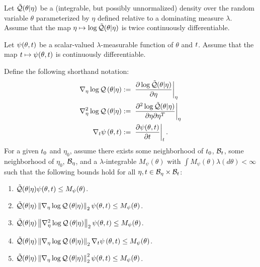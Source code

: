 \begin{assu}
%
Let $\tilde{\mathcal{Q}}(\theta \vert \eta)$ be a (integrable, but possibly unnormalized)
density over the random variable $\theta$ parameterized by $\eta$ defined
relative to a dominating measure $\lambda$.  Assume that the map $\eta \mapsto
\log \tilde{\mathcal{Q}}(\theta \vert \eta)$ is twice continuously differentiable.

Let $\psi(\theta, t)$ be a scalar-valued $\lambda$-measurable function of
$\theta$ and $t$.  Assume that the map $t \mapsto \psi(\theta, t)$ is
continuously differentiable.

Define the following shorthand notation:
%
\begin{align*}
%
\lqgrad{\theta \vert \eta} :={}&
    \fracat{\partial \log \qtil(\theta \vert \eta)}{\partial \eta}{\eta} \\
%
\lqhess{\theta \vert \eta} :={}&
    \fracat{\partial^2 \log \qtil(\theta \vert \eta)}
           {\partial \eta \partial \eta^T}{\eta} \\
%
\psigrad{\theta, \t} :={}& \fracat{\partial \psi(\theta, \t)}{\partial \t}{\t}.
%
\end{align*}
%
For a given $t_0$ and $\eta_0$, assume there exists some neighborhood of
$t_0$, $\mathcal{B}_t$, some neighborhood of $\eta_0$, $\mathcal{B}_\eta$, and a
$\lambda$-integrable $M_\psi(\theta)$ with $\int M_\psi(\theta) \lambda(d\theta) <
\infty$ such that the following bounds hold for all $\eta, t \in \mathcal{B}_\eta
\times \mathcal{B}_t$:
%
\begin{enumerate}
%
\item {}
$\tilde{\mathcal{Q}}(\theta \vert \eta) \psi(\theta, t) \le M_\psi(\theta)$.
%
\item {}
$\tilde{\mathcal{Q}}(\theta \vert \eta) \left\Vert{\nabla_\eta \log \mathcal{Q}}\left(\theta \vert \eta\right)\right\Vert_2 \psi(\theta, t) \le
M_\psi(\theta)$.
%
\item {}
$\tilde{\mathcal{Q}}(\theta \vert \eta) \left\Vert{\nabla_\eta^2 \log \mathcal{Q}}\left(\theta \vert \eta\right)\right\Vert_2 \psi(\theta, t) \le
M_\psi(\theta)$.
%
\item {}
$\tilde{\mathcal{Q}}(\theta \vert \eta) \left\Vert{\nabla_\eta \log \mathcal{Q}}\left(\theta \vert \eta\right)\right\Vert_2 {\nabla_t \psi}\left(\theta, t\right)
\le M_\psi(\theta)$.
%
\item {}
$\tilde{\mathcal{Q}}(\theta \vert \eta) \left\Vert{\nabla_\eta \log \mathcal{Q}}\left(\theta \vert \eta\right)\right\Vert^2_2 \psi(\theta, t) \le
M_\psi(\theta)$.
%
\end{enumerate}
%
\end{assu}


